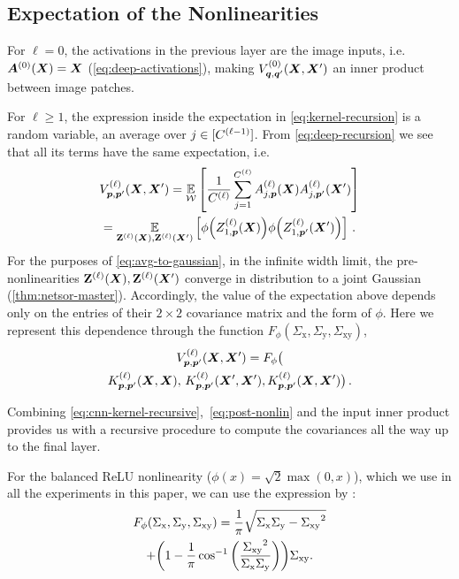 \documentclass[accepted]{uai2021} %
\newcommand{\Sigmax}{{\Sigma_{\text{x}}}}
\newcommand{\Sigmay}{{\Sigma_{\text{y}}}}
\newcommand{\Sigmaxy}{{\Sigma_{\text{xy}}}}
\newcommand{\layerAd}[2]{\mathbf{Z}^{(#1)}_{#2}(\vX')}
\newcommand{\layerAsd}[2]{Z^{(#1)}_{#2}(\vX')}
\newcommand{\layerAs}[2]{Z^{(#1)}_{#2}(\vX)}
\newcommand{\layerA}[2]{\mathbf{Z}^{(#1)}_{#2}(\mX)}
\newcommand{\layerC}[1]{C^{(#1)}}
\newcommand{\layerNLAsd}[2]{A^{(#1)}_{#2}(\vX')}
\newcommand{\layerNLAs}[2]{A^{(#1)}_{#2}(\vX)}
\newcommand{\layerNLA}[2]{\vA^{(#1)}_{#2}(\vX)}
\newcommand{\prevchan}{j}   %
\newcommand{\patch}{\vp}               %
\newcommand{\nextpatch}{\vq}
\newcommand{\covf}[1]{K\ssup{#1}}
\newcommand{\nlinf}[1]{V\ssup{#1}}
\newcommand{\0}{\boldsymbol{0}}
\newcommand{\1}{\boldsymbol{1}}
\newcommand{\crefp}[1]{(\cref{#1})}
\begin{document}
\subsection{Expectation of the Nonlinearities}
\label{sec:exp-nonlin}
For $\ell=0$, the activations in the previous layer are the image inputs, i.e.~$\layerNLA{0}{} = \vX$ (\cref{eq:deep-activations}), making $\nlinf{0}_{\nextpatch,\nextpatch'}\bra{\mX,\mX'}$ an inner product between image patches.

For $\ell\ge 1$, the expression inside the expectation in \cref{eq:kernel-recursion} is a random variable, an average over $\prevchan\in\countto{\layerC{\ell-1}}$. From \cref{eq:deep-recursion} we see that all its terms have the same expectation, i.e.
\begin{multline}
\nlinf{\ell}_{\patch,\patch'}\bra{\mX,\mX'}
= \Expect{\gW}{\frac{1}{\layerC{\ell}} \sum_{\prevchan=1}^{\layerC{\ell}} \layerNLAs{\ell}{\prevchan,\patch} \layerNLAsd{\ell}{\prevchan,\patch'}} \\
= \Expect{ \layerA{\ell}{}, \layerAd{\ell}{} }{\phi\bra{\layerAs{\ell}{1,\patch}} \phi\bra{\layerAsd{\ell}{1,\patch'}}}\,.
\label{eq:avg-to-gaussian}
\end{multline}
For the purposes of \cref{eq:avg-to-gaussian}, in the infinite width limit, the
pre-nonlinearities $\layerA{\ell}{},\layerAd{\ell}{}$ converge in distribution to a joint Gaussian
\crefp{thm:netsor-master}. Accordingly, the value of the expectation above depends only on the entries of their $2\times 2$ covariance matrix and the form of $\phi$. Here we represent this dependence through the function $F_{\phi}(\Sigmax, \Sigmay, \Sigmaxy)$,
\begin{multline}
\nlinf{\ell}_{\patch,\patch'}\bra{\mX,\mX'}
=F_{\phi}\big(\\
\covf{\ell}_{\patch,\patch'}\bra{\mX, \mX},\,\covf{\ell}_{\patch,\patch'}\bra{\mX', \mX'},
\covf{\ell}_{\patch,\patch'}\bra{\mX, \mX'}\big)\,.
\label{eq:post-nonlin}
\end{multline}

Combining \cref{eq:cnn-kernel-recursive},~\ref{eq:post-nonlin} and the input inner product
provides us with a recursive procedure to compute the covariances all the way up to the final layer.

For the balanced ReLU nonlinearity ($\phi(x) = \sqrt{2}\max(0, x)$), which we
use in all the experiments in this paper, we can use the expression by \citet{cho2009mkm}:
\begin{multline}
  F_{\phi}\bra{\Sigmax, \Sigmay, \Sigmaxy} = \frac{1}{\pi} \sqrt{\Sigmax\Sigmay - \Sigmaxy^{2}} \\+ \bra{1 - \frac{1}{\pi}\cos^{-1}\bra{\frac{\Sigmaxy^{2}}{\Sigmax\Sigmay}}} \Sigmaxy.
\end{multline}
\end{document}
